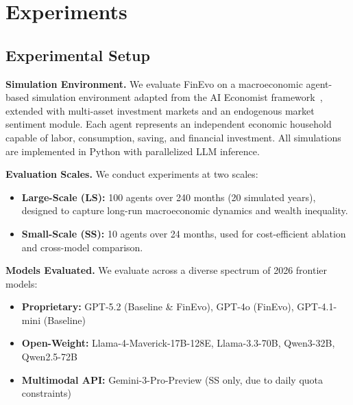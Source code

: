 \ifdefined\FinEvoAllowHistoricalPrePZeroEvidence\else
{}
\fi
\section{Experiments}

\subsection{Experimental Setup}

\noindent\textbf{Simulation Environment.}
We evaluate FinEvo on a macroeconomic agent-based simulation environment adapted from the AI Economist framework~\cite{zheng2020ai}, extended with multi-asset investment markets and an endogenous market sentiment module. Each agent represents an independent economic household capable of labor, consumption, saving, and financial investment. All simulations are implemented in Python with parallelized LLM inference.

\noindent\textbf{Evaluation Scales.}
We conduct experiments at two scales:
\begin{itemize}
    \item \textbf{Large-Scale (LS):} 100 agents over 240 months (20 simulated years), designed to capture long-run macroeconomic dynamics and wealth inequality.
    \item \textbf{Small-Scale (SS):} 10 agents over 24 months, used for cost-efficient ablation and cross-model comparison.
\end{itemize}

\noindent\textbf{Models Evaluated.}
We evaluate across a diverse spectrum of 2026 frontier models:
\begin{itemize}
    \item \textbf{Proprietary:} GPT-5.2 (Baseline \& FinEvo), GPT-4o (FinEvo), GPT-4.1-mini (Baseline)
    \item \textbf{Open-Weight:} Llama-4-Maverick-17B-128E, Llama-3.3-70B, Qwen3-32B, Qwen2.5-72B
    \item \textbf{Multimodal API:} Gemini-3-Pro-Preview (SS only, due to daily quota constraints)
\end{itemize}

